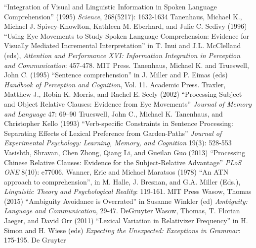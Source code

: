 \documentclass[a4paper]{article}
\begin{document}
``Integration of Visual and Linguistic Information in Spoken Language Comprehension''  (1995)
{\it Science}, 268(5217): 1632-1634
\newline
\newline
Tanenhaus, Michael K., Michael J. Spivey-Knowlton, Kathleen M. Eberhard, and Julie C. Sedivy (1996)  ``Using Eye Movements to Study Spoken Language Comprehension:  Evidence for Visually Mediated Incremental Interpretation''  in T. Inui and J.L. McClelland (eds), {\it Attention and Performance XVI:  Information Integration in Perception and Communication}: 457-478. MIT Press. 
\newline
\newline
Tanenhaus, Michael K. and Trueswell, John C. (1995)  ``Sentence comprehension'' in J. Miller and P. Eimas (eds) {\it Handbook of Perception and Cognition}, Vol. 11.  Academic Press.
\newline
\newline
Traxler, Matthew J., Robin K. Morris, and Rachel E. Seely (2002) ``Processing Subject and Object Relative Clauses: 
Evidence from Eye Movements'' {\it Journal of Memory and Language} 47: 69–90 
\newline
\newline
Trueswell, John C., Michael K. Tanenhaus, and Christopher Kello (1993) ``Verb-specific Constraints in Sentence Processing: Separating Effects of Lexical Preference from Garden-Paths'' {\it Journal of Experimental Psychology: Learning, Memory, and Cognition} 19(3): 528-553
\newline
\newline
Vasishth, Shravan, Chen Zhong, Qiang Li, and Gueilan Guo (2013) ``Processing Chinese Relative Clauses: Evidence for the Subject-Relative Advantage'' {\it PLoS ONE} 8(10): e77006.
\newline    
\newline
Wanner, Eric and Michael Maratsos (1978) ``An ATN approach to comprehension'', in M. Halle, J. Bresnan, and G.A. Miller (Eds.), {\it Linguistic Theory and Psychological Reality}: 119-161. MIT Press
\newline
\newline
Wasow, Thomas  (2015) ``Ambiguity Avoidance is Overrated'' in Susanne Winkler (ed) {\it Ambiguity: Language and Communication}, 29-47. DeGruyter
 \newline
\newline
Wasow, Thomas, T. Florian Jaeger, and David Orr (2011) ``Lexical Variation in Relativizer Frequency'' in H. Simon and H. Wiese (eds) {\it Expecting the Unexpected: Exceptions in Grammar}: 175-195. De Gruyter 
\end{document}
